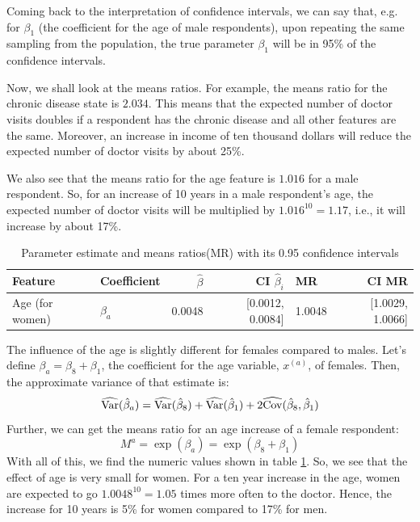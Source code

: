 \documentclass[a4paper,11pt]{article}
\begin{document}
Coming back to the interpretation of confidence intervals, we can say that, e.g. for $\beta_1$ (the coefficient for the age of male respondents), upon repeating the same sampling from the population, the true parameter $\beta_1$ will be in 95\% of the confidence intervals.

Now, we shall look at the means ratios. For example, the means ratio for the chronic disease state is $2.034$. This means that the expected number of doctor visits doubles if a respondent has the chronic disease and all other features are the same. Moreover, an increase in income of ten thousand dollars will reduce the expected number of doctor visits by about 25\%.



We also see that the means ratio for the age feature is $1.016$ for a male respondent. So, for an increase of 10 years in a male respondent's age, the expected number of doctor visits will be multiplied by $1.016^{10} = 1.17$, i.e., it will increase by about 17\%. 

\begin{table}[h]
\centering
\begin{tabular}{l|l|r|r|l|r|}
\hline
Feature & Coefficient & $\hat{\beta}$ & CI $\hat{\beta}_i$ & MR & CI MR\\
\hline
         Age (for women)& $\beta_a $ & 0.0048&[0.0012, 0.0084]& 1.0048 &[1.0029, 1.0066] \\
\hline
 \end{tabular}
 \caption{\label{tab:femal_age}Parameter estimate and means ratios(MR)
             with its 0.95 confidence intervals}
\end{table}

The influence of the age is slightly different for females compared to males. Let's define $\beta_a = \beta_8 + \beta_1$, the coefficient for the age variable, $x^{(a)}$, of females. Then, the approximate variance of that estimate is:
\begin{equation}
\widehat{\mathrm{Var}}(\hat{\beta}_a) = \widehat{\mathrm{Var}}(\hat{\beta}_8) + \widehat{\mathrm{Var}}(\hat{\beta}_1) + 2 \widehat{\mathrm{Cov}}(\hat{\beta}_8, \hat{\beta}_1)
\end{equation}
Further, we can get the means ratio for an age increase of a female respondent:
\begin{equation}
M^a = \exp(\beta_a) = \exp(\beta_8 + \beta_1)
\end{equation}
With all of this, we find the numeric values shown in table \ref{tab:femal_age}.
So, we see that the effect of age is very small for women. For a ten year increase in the age, women are expected to go $1.0048^{10} = 1.05$ times more often to the doctor. Hence, the increase for 10 years is 5\% for women compared to 17\% for men. 
\end{document}
